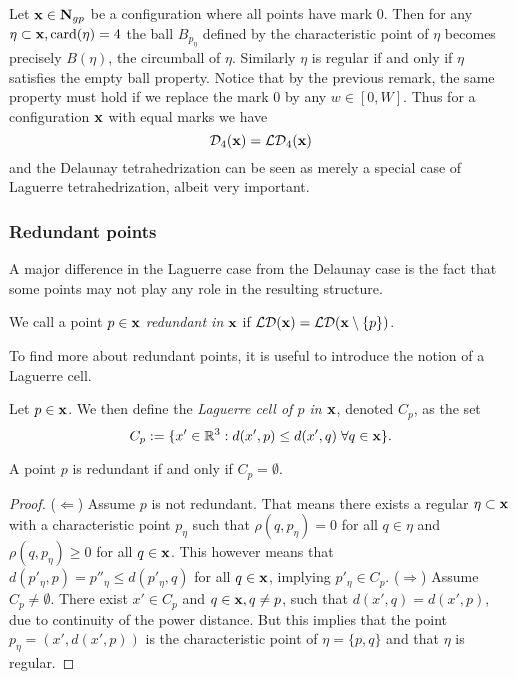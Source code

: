 \begin{remark}\label{rem:LaguerreToDelaunay}
	Let ${\mathbf{x}} \in \mathbf N_{gp}$ be a configuration where all points have mark $0$. Then for any $\eta \subset {\mathbf{x}}, \mathrm{card}(\eta)=4$ the ball $B_{p_\eta}$ defined by the characteristic point of $\eta$ becomes precisely $B(\eta)$, the circumball of $\eta$. Similarly $\eta$ is regular if and only if $\eta$ satisfies the empty ball property. Notice that by the previous remark, the same property must hold if we replace the mark $0$ by any $w\in[0,W]$. Thus for a configuration ${\mathbf{x}}$ with equal marks we have 
	$$\mathcal D_4({\mathbf{x}})=\mathcal {LD}_4({\mathbf{x}})$$ 
	and the Delaunay tetrahedrization can be seen as merely a special case of Laguerre tetrahedrization, albeit very important.
\end{remark}


\subsubsection{Redundant points}\label{sec:redundant}

A major difference in the Laguerre case from the Delaunay case is the fact that some points may not play any role in the resulting structure.

\begin{definition}
	We call a point $p \in {\mathbf{x}}$ \textit{redundant in} ${\mathbf{x}}$ if $\mathcal {LD}({\mathbf{x}}) = \mathcal {LD}({\mathbf{x}} \setminus \{p\})$.
\end{definition}

To find more about redundant points, it is useful to introduce the notion of a Laguerre cell.

\begin{definition}
Let $p\in {\mathbf{x}}$. We then define the \textit{Laguerre cell of $p$ in ${\mathbf{x}}$}, denoted $C_p$, as the set
$$C_p := \{x' \in {\mathbb R^3}: d(x',p) \leq d(x',q) \; \forall q \in {\mathbf{x}}\}.$$ 
\end{definition}

\begin{proposition}
	A point $p$ is redundant if and only if $C_p=\emptyset$.
\end{proposition}
\begin{proof}
	($\Leftarrow$) Assume $p$ is not redundant. That means there exists a regular $\eta\subset {\mathbf{x}}$ with a characteristic point $p_\eta$ such that $\rho(q,p_\eta)=0$ for all $q\in\eta$ and $\rho(q,p_\eta)\geq 0$ for all $q\in {\mathbf{x}}$. This however means that $d(p'_\eta,p) = p''_\eta \leq d(p'_\eta,q)$ for all $q\in{\mathbf{x}}$, implying $p'_\eta \in C_p$. \newline
	($\Rightarrow$) Assume $C_p \neq \emptyset$. There exist $x' \in C_p$ and $q\in{\mathbf{x}}, q\neq p$, such that $d(x',q)=d(x',p)$, due to continuity of the power distance. But this implies that the point $p_\eta = (x', d(x',p))$ is the characteristic point of $\eta=\{p,q\}$ and that $\eta$ is regular.
\end{proof}

